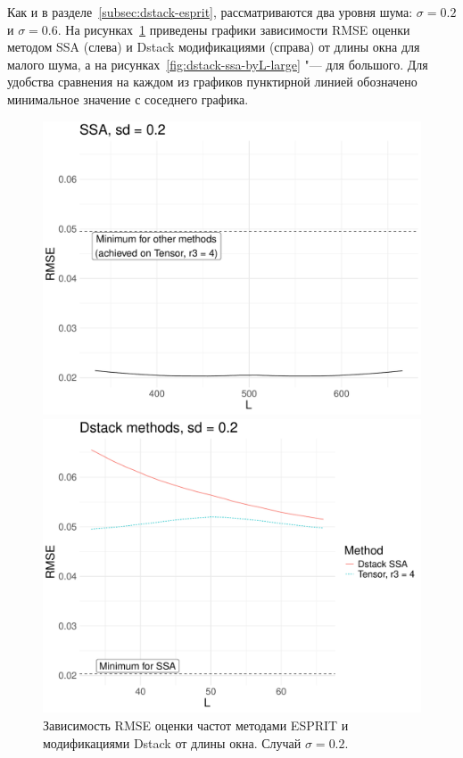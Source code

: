 \documentclass[specialist,
  substylefile=spbu_report.rtx,
subf,href,colorlinks=true, 12pt]{disser}
\theoremstyle{plain}
\theoremstyle{definition}
\theoremstyle{remark}
\begin{document}
Как и в разделе~\ref{subsec:dstack-esprit}, рассматриваются два
уровня шума: $\sigma=0.2$ и $\sigma = 0.6$.
На рисунках~\ref{fig:dstack-ssa-byL-small} приведены графики
зависимости RMSE оценки методом SSA (слева) и Dstack модификациями
(справа) от длины окна для малого шума, а на
рисунках~\ref{fig:dstack-ssa-byL-large} "--- для большого.
Для удобства сравнения на каждом из графиков
пунктирной линией обозначено минимальное значение с соседнего графика.
\begin{figure}[!ht]
  \begin{minipage}{0.48\textwidth}
    \centering
    \includegraphics[width=\textwidth]{htlsd_byL_real_rec_rmse_ssa_2.pdf}
  \end{minipage}
  \begin{minipage}{0.48\textwidth}
    \centering
    \includegraphics[width=\textwidth]{htlsd_byL_real_rec_rmse_dstack_2.pdf}
  \end{minipage}
  \caption{Зависимость RMSE оценки частот методами ESPRIT и
  модификациями Dstack от длины окна. Случай $\sigma = 0.2$.}
  \label{fig:dstack-ssa-byL-small}
\end{figure}
\end{document}
